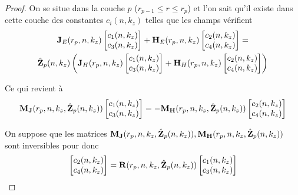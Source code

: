     \begin{proof}
      On se situe dans la couche \(p\) (\(r_{p-1}\le r\le r_p\)) et l'on sait qu'il existe dans cette couche des constantes \(c_i(n,k_z)\) telles que les champs vérifient
      \begin{multline*}
        \mathbf{J}_{E}(r_{p},n,k_z)
        \begin{bmatrix}
          c_1(n,k_z) \\
          c_3(n,k_z)
        \end{bmatrix}
        +
        \mathbf{H}_{E}(r_{p},n,k_z)
        \begin{bmatrix}
          c_2(n,k_z) \\
          c_4(n,k_z)
        \end{bmatrix}
        =
        \\
        \hat {\mathbf{Z}}_{p}(n,k_z)
        \left(
          \mathbf{J}_{H}(r_{p},n,k_z)
          \begin{bmatrix}
            c_1(n,k_z) \\
            c_3(n,k_z)
          \end{bmatrix}
          +
          \mathbf{H}_{H}(r_{p},n,k_z)
          \begin{bmatrix}
            c_2(n,k_z) \\
            c_4(n,k_z)
          \end{bmatrix}
        \right)
      \end{multline*}

      Ce qui revient à 
      \begin{equation*}
        \mathbf{M}_{\mathbf{J}}(r_{p},n,k_z,\hat{\mathbf{Z}}_p(n,k_z))
        \begin{bmatrix}
          c_1(n,k_z) \\
          c_3(n,k_z)
        \end{bmatrix}
        =
        -\mathbf{M}_{\mathbf{H}}(r_{p},n,k_z,\hat{\mathbf{Z}}_p(n,k_z))
        \begin{bmatrix}
          c_2(n,k_z) \\
          c_4(n,k_z)
        \end{bmatrix}
      \end{equation*}

      On suppose que les matrices \(\mathbf{M}_{\mathbf{J}}(r_p,n,k_z,\hat{\mathbf{Z}}_p(n,k_z)), \mathbf{M}_{\mathbf{H}}(r_p,n,k_z,\hat{\mathbf{Z}}_p(n,k_z))\) sont inversibles pour donc
      \begin{equation*}
        \begin{bmatrix}
          c_2(n,k_z) \\
          c_4(n,k_z)
        \end{bmatrix}
        =
        \mathbf{R}(r_{p},n,k_z,\hat{\mathbf{Z}}_p(n,k_z))
        \begin{bmatrix}
          c_1(n,k_z) \\
          c_3(n,k_z)
        \end{bmatrix}
      \end{equation*}


\end{proof}
